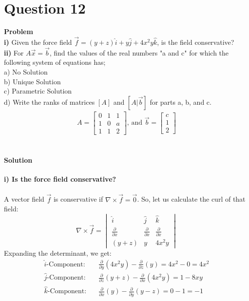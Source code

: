 \documentclass{article}
\begin{document}
\section{Question 12}
\textbf{Problem}
\\
\textbf{i)}
Given the force field $\vec{f} = (y+z)\hat{i} + y\hat{j} +4x^{2}y\hat{k}$, is
the field conservative?
\\
\textbf{ii)}
For $A\vec{x} = \vec{b}$, find the values of the real numbers "a and
c" for which the following system of equations has;
\\
a) No Solution
\\
b) Unique Solution
\\
c) Parametric Solution
\\
d) Write the ranks of matrices $[A]$ and $[A|\vec{b}]$ for parts a, b, and c.
\\
\begin{align*}
	A =
	\begin{bmatrix}
		0 & 1 & 1 \\
		1 & 0 & a \\
		1 & 1 & 2
	\end{bmatrix}
	\text{, and }
	\vec{b} =
	\begin{bmatrix}
		c \\
		1 \\
		2
	\end{bmatrix}
\end{align*}
\\
\\
\textbf{Solution}
\\
\\
\textbf{i) Is the force field conservative?}
\\
\\
A vector field $\vec{f}$ is conservative if $\nabla \times \vec{f} = \vec{0}$.
So, let us calculate the curl of that field:
\[
	\nabla \times \vec{f} = \begin{vmatrix}
		\hat{i}                     & \hat{j}                     & \hat{k}                     \\
		\frac{\partial}{\partial x} & \frac{\partial}{\partial x} & \frac{\partial}{\partial x} \\
		(y+z)                       & y                           & 4x^{2}y
	\end{vmatrix}
\]
Expanding the determinant, we get:
\begin{align*}
	\text{$\hat{i}$-Component:} \quad & \frac{\partial}{\partial y}(4x^{2}y) - \frac{\partial}{\partial z}(y) = 4x^{2} - 0 = 4x^{2} \\
	\text{$\hat{j}$-Component:} \quad & \frac{\partial}{\partial z}(y+z) - \frac{\partial}{\partial x}(4x^{2}y) = 1 - 8xy           \\
	\text{$\hat{k}$-Component:} \quad & \frac{\partial}{\partial x}(y) - \frac{\partial}{\partial y}(y-z) = 0 - 1 = -1              \\
\end{align*}
\end{document}
